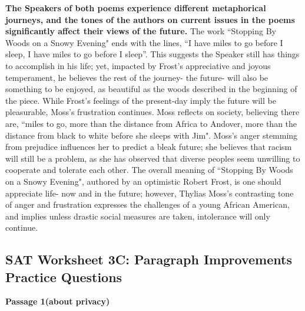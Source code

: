 \begin{enumerate}
\textbf{The Speakers of both poems experience different metaphorical journeys, and the tones of the authors on current issues in the poems significantly affect their views of the future.} The work “Stopping By Woods on a Snowy Evening" ends with the lines, ``I have miles to go before I sleep, I have miles to go before I sleep”. This suggests the Speaker still has things to accomplish in his life; yet, impacted by Frost's appreciative and joyous temperament, he believes the rest of the journey- the future- will also be something to be enjoyed, as beautiful as the woods described in the beginning of the piece. While Frost's feelings of the present-day imply the future will be pleasurable, Moss's frustration continues. Moss reflects on society, believing there are, ``miles to go, more than the distance from Africa to Andover, more than the distance from black to white before she sleeps with Jim". Moss's anger stemming from prejudice influences her to predict a bleak future; she believes that racism will still be a problem, as she has observed that diverse peoples seem unwilling to cooperate and tolerate each other. The overall meaning of ``Stopping By Woods on a Snowy Evening", authored by an optimistic Robert Frost, is one should appreciate life- now and in the future; however, Thylias Moss's contrasting tone of anger and frustration expresses the challenges of a young African American, and implies unless drastic social measures are taken, intolerance will only continue. 
\end{enumerate}





\subsection{SAT Worksheet 3C: Paragraph Improvements Practice Questions}

\textbf{Passage 1(about privacy)}


